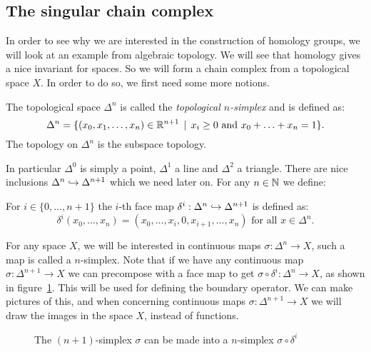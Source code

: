 
\subsection{The singular chain complex}
In order to see why we are interested in the construction of homology groups, we will look at an example from algebraic topology. We will see that homology gives a nice invariant for spaces. So we will form a chain complex from a topological space $X$. In order to do so, we first need some more notions.
\begin{definition}
	The topological space $\Delta^n$ is called the \emph{topological $n$-simplex} and is defined as:
	$$ \Delta^n = \{(x_0, x_1, \ldots, x_n) \in \mathbb{R}^{n+1} \,\mid\, x_i \geq 0 \text{ and } x_0 + \ldots + x_n = 1 \}.$$
	The topology on $\Delta^n$ is the subspace topology.
\end{definition}

In particular $\Delta^0$ is simply a point, $\Delta^1$ a line and $\Delta^2$ a triangle. There are nice inclusions $\Delta^n \hookrightarrow \Delta^{n+1}$ which we need later on. For any $n \in \mathbb{N}$ we define:
\begin{definition}
	For $i \in \{0, \ldots, n+1\}$ the $i$-th face map $\delta^i : \Delta^n \hookrightarrow \Delta^{n+1}$ is defined as:
	$$ \delta^i (x_0, \ldots, x_n) = (x_0, \ldots, x_{i}, 0, x_{i+1}, \ldots, x_n) \text{ for all } x \in \Delta^n.$$
\end{definition}

For any space $X$, we will be interested in continuous maps $\sigma : \Delta^n \to X$, such a map is called a $n$-simplex. Note that if we have any continuous map $\sigma : \Delta^{n+1} \to X$ we can precompose with a face map to get $\sigma \circ \delta^i : \Delta^n \to X$, as shown in figure~\ref{fig:diagram_d}. This will be used for defining the boundary operator. We can make pictures of this, and when concerning continuous maps $\sigma : \Delta^{n+1} \to X$ we will draw the images in the space $X$, instead of functions.

\begin{figure}
	\caption{The $(n+1)$-simplex $\sigma$ can be made into a $n$-simplex $\sigma \circ \delta^i$}
	\label{fig:diagram_d}
\end{figure}

